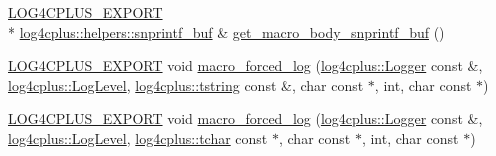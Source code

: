 \begin{DoxyCompactItemize}
\item 
\hyperlink{config_8hxx_ab13cb1a5317c245ee2ef4f2bfe0cfb2d}{L\-O\-G4\-C\-P\-L\-U\-S\-\_\-\-E\-X\-P\-O\-R\-T} \\*
\hyperlink{classlog4cplus_1_1helpers_1_1snprintf__buf}{log4cplus\-::helpers\-::snprintf\-\_\-buf} \& \hyperlink{namespacelog4cplus_1_1detail_a668e9af915ead0b6a0958748d40628aa}{get\-\_\-macro\-\_\-body\-\_\-snprintf\-\_\-buf} ()
\item 
\hyperlink{config_8hxx_ab13cb1a5317c245ee2ef4f2bfe0cfb2d}{L\-O\-G4\-C\-P\-L\-U\-S\-\_\-\-E\-X\-P\-O\-R\-T} void \hyperlink{namespacelog4cplus_1_1detail_ac84dd9a612fd659769b0e1031692b172}{macro\-\_\-forced\-\_\-log} (\hyperlink{classlog4cplus_1_1Logger}{log4cplus\-::\-Logger} const \&, \hyperlink{namespacelog4cplus_abd332cc8c98fefcbbdcf57b6b3867de9}{log4cplus\-::\-Log\-Level}, \hyperlink{namespacelog4cplus_a3c9287f6ebcddc50355e29d71152117b}{log4cplus\-::tstring} const \&, char const $\ast$, int, char const $\ast$)
\item 
\hyperlink{config_8hxx_ab13cb1a5317c245ee2ef4f2bfe0cfb2d}{L\-O\-G4\-C\-P\-L\-U\-S\-\_\-\-E\-X\-P\-O\-R\-T} void \hyperlink{namespacelog4cplus_1_1detail_a9bc052f71eff2b3505db50dcb4ef029a}{macro\-\_\-forced\-\_\-log} (\hyperlink{classlog4cplus_1_1Logger}{log4cplus\-::\-Logger} const \&, \hyperlink{namespacelog4cplus_abd332cc8c98fefcbbdcf57b6b3867de9}{log4cplus\-::\-Log\-Level}, \hyperlink{namespacelog4cplus_a7b80b5711ae9e7a1ddd97dbaefbe3583}{log4cplus\-::tchar} const $\ast$, char const $\ast$, int, char const $\ast$)
\end{DoxyCompactItemize}


